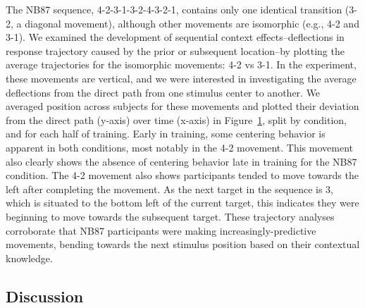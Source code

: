 \documentclass[man,floatsintext]{apa6}
\begin{document}
\begin{figure}[t]
\begin{subfigure}[t]{0.54\textwidth}
        \end{subfigure}
        \label{fig:Traj_4231}
\end{figure}

\addtocounter{figure}{-1}

The NB87 sequence, 4-2-3-1-3-2-4-3-2-1, contains only one identical transition (3-2, a diagonal movement), although other movements are isomorphic (e.g., 4-2 and 3-1). We examined the development of sequential context effects--deflections in response trajectory caused by the prior or subsequent location--by plotting the average trajectories for the isomorphic movements: 4-2 vs 3-1. In the experiment, these movements are vertical, and we were interested in investigating the average deflections from the direct path from one stimulus center to another. We averaged position across subjects for these movements and plotted their deviation from the direct path (y-axis) over time (x-axis) in Figure~\ref{fig:Traj_4231}, split by condition, and for each half of training. Early in training, some centering behavior is apparent in both conditions, most notably in the 4-2 movement. This movement also clearly shows the absence of centering behavior late in training for the NB87 condition. The 4-2 movement also shows participants tended to move towards the left after completing the movement. As the next target in the sequence is 3, which is situated to the bottom left of the current target, this indicates they were beginning to move towards the subsequent target. These trajectory analyses corroborate that NB87 participants were making increasingly-predictive movements, bending towards the next stimulus position based on their contextual knowledge.


\subsection{Discussion}
\end{document}
